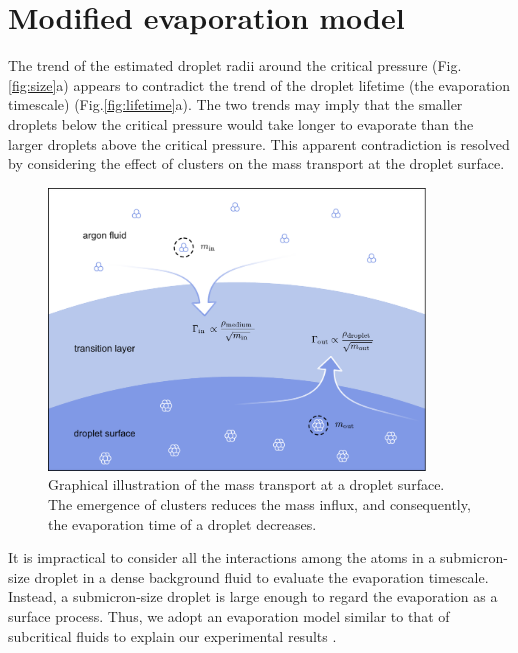 \section{Modified evaporation model}
\label{sec:ch2-5}

The trend of the estimated droplet radii around the critical pressure (Fig.\ref{fig:size}a) appears to contradict the trend of the droplet lifetime (the evaporation timescale) (Fig.\ref{fig:lifetime}a). The two trends may imply that the smaller droplets below the critical pressure would take longer to evaporate than the larger droplets above the critical pressure. This apparent contradiction is resolved by considering the effect of clusters on the mass transport at the droplet surface.

\begin{figure}[ht!]
\centering
\includegraphics[width=100mm]{figures/ch2/transport/evaporation.pdf}
\caption{Graphical illustration of the mass transport at a droplet surface. The emergence of clusters reduces the mass influx, and consequently, the evaporation time of a droplet decreases.}
\label{fig:evaporation}
\end{figure}

It is impractical to consider all the interactions among the atoms in a submicron-size droplet in a dense background fluid to evaluate the evaporation timescale. Instead, a submicron-size droplet is large enough to regard the evaporation as a surface process. Thus, we adopt an evaporation model similar to that of subcritical fluids to explain our experimental results \cite{ishiyama2004molecular, julin2013mass}.


